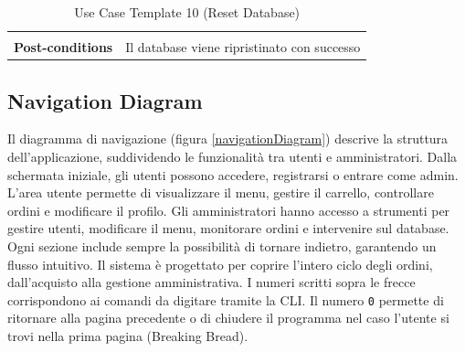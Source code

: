\documentclass{article}
\begin{document}
\begin{table}
\begin{tabularx}{\textwidth}{|lX|}
\begin{description}[nosep,before=\leavevmode\vspace*{-1\baselineskip},after=\leavevmode\vspace*{-1\baselineskip}]
                                                                    \end{description} \\
                    \rowcolor{white} \textbf{Post-conditions} & Il database viene ripristinato con successo \\
                    \toprule
                \end{tabularx}
                \caption{Use Case Template 10 (Reset Database)}
                \label{tab:use-case-template-10}
            \end{table}
            \clearpage
            


            
            \renewcommand{\arraystretch}{1}

    \vspace{1cm}

\subsection{Navigation Diagram}
Il diagramma di navigazione (figura \ref{navigationDiagram}) descrive la struttura dell'applicazione, suddividendo le funzionalità tra utenti e amministratori. Dalla schermata iniziale, gli utenti possono accedere, registrarsi o entrare come admin. L'area utente permette di visualizzare il menu, gestire il carrello, controllare ordini e modificare il profilo. Gli amministratori hanno accesso a strumenti per gestire utenti, modificare il menu, monitorare ordini e intervenire sul database. Ogni sezione include sempre la possibilità di tornare indietro, garantendo un flusso intuitivo. Il sistema è progettato per coprire l'intero ciclo degli ordini, dall'acquisto alla gestione amministrativa. I numeri scritti sopra le
frecce corrispondono ai comandi da digitare tramite la CLI. Il numero \texttt{0} permette di ritornare alla pagina precedente o di chiudere il programma nel caso l'utente si trovi nella prima pagina (Breaking Bread).
\end{document}
